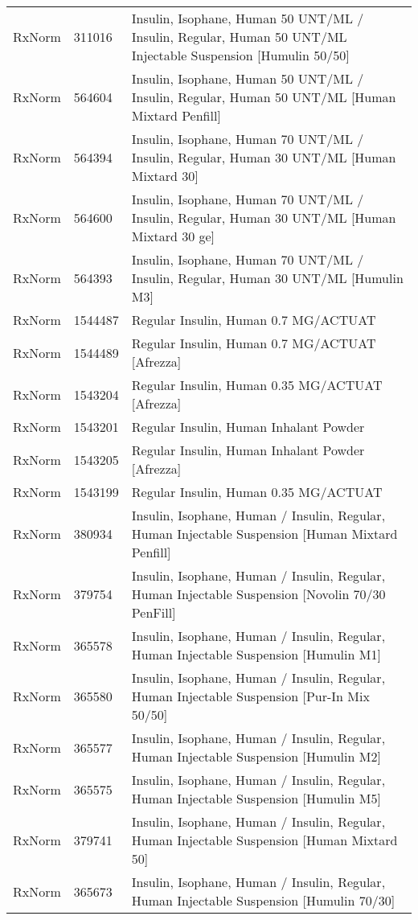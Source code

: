 \begin{longtable}{p{}p{}p{}}
  RxNorm & 311016 & Insulin, Isophane, Human 50 UNT/ML / Insulin, Regular, Human 50 UNT/ML Injectable Suspension [Humulin 50/50] \\ 
  RxNorm & 564604 & Insulin, Isophane, Human 50 UNT/ML / Insulin, Regular, Human 50 UNT/ML [Human Mixtard Penfill] \\ 
  RxNorm & 564394 & Insulin, Isophane, Human 70 UNT/ML / Insulin, Regular, Human 30 UNT/ML [Human Mixtard 30] \\ 
  RxNorm & 564600 & Insulin, Isophane, Human 70 UNT/ML / Insulin, Regular, Human 30 UNT/ML [Human Mixtard 30 ge] \\ 
  RxNorm & 564393 & Insulin, Isophane, Human 70 UNT/ML / Insulin, Regular, Human 30 UNT/ML [Humulin M3] \\ 
  RxNorm & 1544487 & Regular Insulin, Human 0.7 MG/ACTUAT \\ 
  RxNorm & 1544489 & Regular Insulin, Human 0.7 MG/ACTUAT [Afrezza] \\ 
  RxNorm & 1543204 & Regular Insulin, Human 0.35 MG/ACTUAT [Afrezza] \\ 
  RxNorm & 1543201 & Regular Insulin, Human Inhalant Powder \\ 
  RxNorm & 1543205 & Regular Insulin, Human Inhalant Powder [Afrezza] \\ 
  RxNorm & 1543199 & Regular Insulin, Human 0.35 MG/ACTUAT \\ 
  RxNorm & 380934 & Insulin, Isophane, Human / Insulin, Regular, Human Injectable Suspension [Human Mixtard Penfill] \\ 
  RxNorm & 379754 & Insulin, Isophane, Human / Insulin, Regular, Human Injectable Suspension [Novolin 70/30 PenFill] \\ 
  RxNorm & 365578 & Insulin, Isophane, Human / Insulin, Regular, Human Injectable Suspension [Humulin M1] \\ 
  RxNorm & 365580 & Insulin, Isophane, Human / Insulin, Regular, Human Injectable Suspension [Pur-In Mix 50/50] \\ 
  RxNorm & 365577 & Insulin, Isophane, Human / Insulin, Regular, Human Injectable Suspension [Humulin M2] \\ 
  RxNorm & 365575 & Insulin, Isophane, Human / Insulin, Regular, Human Injectable Suspension [Humulin M5] \\ 
  RxNorm & 379741 & Insulin, Isophane, Human / Insulin, Regular, Human Injectable Suspension [Human Mixtard 50] \\ 
  RxNorm & 365673 & Insulin, Isophane, Human / Insulin, Regular, Human Injectable Suspension [Humulin 70/30] \\ 

\end{longtable}
